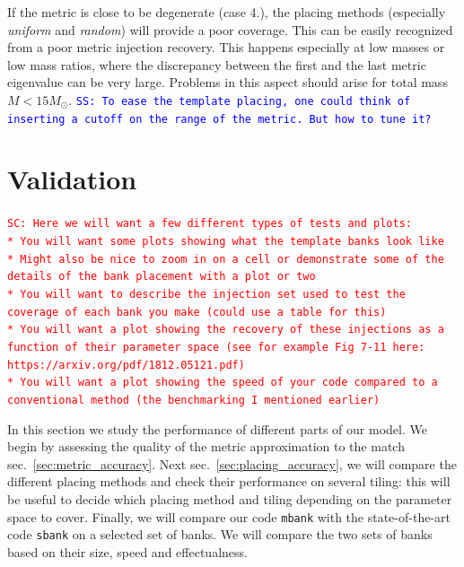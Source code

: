 \documentclass[twocolumn,showpacs,preprintnumbers,nofootinbib,prd,
superscriptaddress,10pt]{revtex4-2}
\newcommand{\mbank}{\texttt{mbank} }
\newcommand{\stefano}[1]{{\textcolor{blue}{\texttt{SS: #1}} }}
\newcommand{\sarah}[1]{{\textcolor{red}{\texttt{SC: #1}} }}
\begin{document}
If the metric is close to be degenerate (case 4.), the placing methods (especially {\it uniform} and {\it random}) will provide a poor coverage. This can be easily recognized from a poor metric injection recovery. This happens especially at low masses or low mass ratios, where the discrepancy between the first and the last metric eigenvalue can be very large. Problems in this aspect should arise for total mass $M<15 M_{\odot}$.
\stefano{To ease the template placing, one could think of inserting a cutoff on the range of the metric. But how to tune it?}


\section{Validation} \label{sec:validation}

\sarah{Here we will want a few different types of tests and plots:\\
* You will want some plots showing what the template banks look like\\
* Might also be nice to zoom in on a cell or demonstrate some of the details of the bank placement with a plot or two\\
* You will want to describe the injection set used to test the coverage of each bank you make (could use a table for this)\\
* You will want a plot showing the recovery of these injections as a function of their parameter space (see for example Fig 7-11 here: https://arxiv.org/pdf/1812.05121.pdf)\\
* You will want a plot showing the speed of your code compared to a conventional method (the benchmarking I mentioned earlier) \\
}

In this section we study the performance of different parts of our model. We begin by assessing the quality of the metric approximation to the match sec.~\ref{sec:metric_accuracy}.
Next sec.~\ref{sec:placing_accuracy}, we will compare the different placing methods and check their performance on several tiling: this will be useful to decide which placing method and tiling depending on the parameter space to cover.
Finally, we will compare our code \mbank with the state-of-the-art code \texttt{sbank} \cite{sbank} on a selected set of banks. We will compare the two sets of banks based on their size, speed and effectualness.
\end{document}
